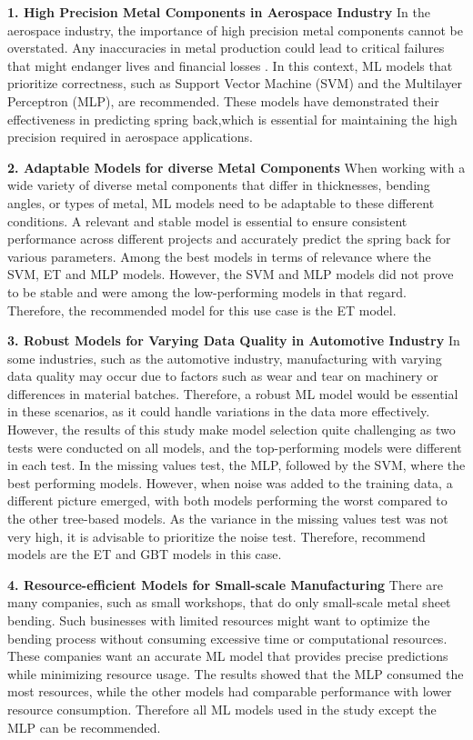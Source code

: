 \textbf{1. High Precision Metal Components in Aerospace Industry}
In the aerospace industry, the importance of high precision metal components cannot be overstated.
Any inaccuracies in metal production could lead to critical failures that might endanger lives and financial losses .
In this context, ML models that prioritize correctness, such as Support Vector Machine (SVM) and the Multilayer
Perceptron (MLP), are recommended.
These models have demonstrated their effectiveness in predicting spring back,which is essential for maintaining the
high precision required in aerospace applications.


\textbf{2. Adaptable Models for diverse Metal Components}
When working with a wide variety of diverse metal components that differ in thicknesses, bending angles, or types of
metal, ML models need to be adaptable to these different conditions.
A relevant and stable model is essential to ensure consistent performance across different projects and accurately
predict the spring back for various parameters.
Among the best models in terms of relevance where the SVM, ET and MLP models.
However, the SVM and MLP models did not prove to be stable and were among the low-performing models in that regard.
Therefore, the recommended model for this use case is the ET model.


\textbf{3. Robust Models for Varying Data Quality in Automotive Industry}
In some industries, such as the automotive industry, manufacturing with varying data quality may occur due to factors
such as wear and tear on machinery or differences in material batches.
Therefore, a robust ML model would be essential in these scenarios, as it could handle variations in the data more
effectively.
However, the results of this study make model selection quite challenging as two tests were conducted on all models,
and the top-performing models were different in each test.
In the missing values test, the MLP, followed by the SVM, where the best performing models.
However, when noise was added to the training data, a different picture emerged, with both models
performing the worst compared to the other tree-based models.
As the variance in the missing values test was not very
high,  it is advisable to prioritize the noise test.
Therefore, recommend models are the ET and GBT models in this case.


\textbf{4. Resource-efficient Models for Small-scale Manufacturing}
There are many companies, such as small workshops, that do only small-scale metal sheet bending.
Such businesses with limited resources might want to optimize the bending process without consuming
excessive time or computational resources.
These companies want an accurate ML model that provides precise predictions while minimizing resource usage.
The results showed that the MLP consumed the most resources, while the other models had comparable performance with
lower resource consumption.
Therefore all ML models used in the study except the MLP can be recommended.


